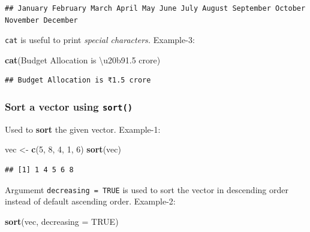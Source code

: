 \documentclass[
]{book}
\newenvironment{Shaded}{\begin{snugshade}}{\end{snugshade}}
\newcommand{\AttributeTok}[1]{\textcolor[rgb]{0.13,0.29,0.53}{#1}}
\newcommand{\ConstantTok}[1]{\textcolor[rgb]{0.56,0.35,0.01}{#1}}
\newcommand{\DecValTok}[1]{\textcolor[rgb]{0.00,0.00,0.81}{#1}}
\newcommand{\FunctionTok}[1]{\textcolor[rgb]{0.13,0.29,0.53}{\textbf{#1}}}
\newcommand{\NormalTok}[1]{#1}
\newcommand{\OtherTok}[1]{\textcolor[rgb]{0.56,0.35,0.01}{#1}}
\newcommand{\StringTok}[1]{\textcolor[rgb]{0.31,0.60,0.02}{#1}}
\begin{document}
\begin{verbatim}
## January February March April May June July August September October November December
\end{verbatim}

\texttt{cat} is useful to print \emph{special characters.} Example-3:

\begin{Shaded}
\begin{Highlighting}[]
\FunctionTok{cat}\NormalTok{(}\StringTok{\textquotesingle{}Budget Allocation is \textbackslash{}u20b91.5 crore\textquotesingle{}}\NormalTok{)}
\end{Highlighting}
\end{Shaded}

\begin{verbatim}
## Budget Allocation is ₹1.5 crore
\end{verbatim}

\hypertarget{sort-a-vector-using-sort}{%
\subsubsection*{\texorpdfstring{Sort a vector using \texttt{sort()}}{Sort a vector using sort()}}\label{sort-a-vector-using-sort}}

Used to \textbf{sort} the given vector. Example-1:

\begin{Shaded}
\begin{Highlighting}[]
\NormalTok{vec }\OtherTok{\textless{}{-}} \FunctionTok{c}\NormalTok{(}\DecValTok{5}\NormalTok{, }\DecValTok{8}\NormalTok{, }\DecValTok{4}\NormalTok{, }\DecValTok{1}\NormalTok{, }\DecValTok{6}\NormalTok{)}
\FunctionTok{sort}\NormalTok{(vec)}
\end{Highlighting}
\end{Shaded}

\begin{verbatim}
## [1] 1 4 5 6 8
\end{verbatim}

Argumemt \texttt{decreasing\ =\ TRUE} is used to sort the vector in descending order instead of default ascending order.
Example-2:

\begin{Shaded}
\begin{Highlighting}[]
\FunctionTok{sort}\NormalTok{(vec, }\AttributeTok{decreasing =}  \ConstantTok{TRUE}\NormalTok{)}
\end{Highlighting}
\end{Shaded}
\end{document}
